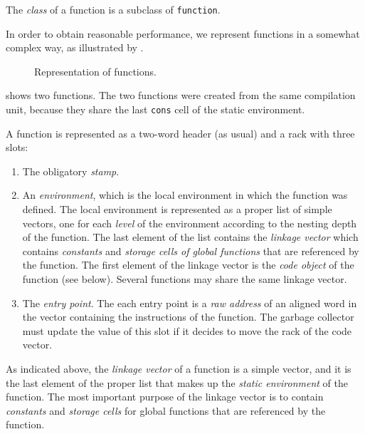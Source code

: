 The \emph{class} of a function is a subclass of \texttt{function}.

In order to obtain reasonable performance, we represent functions in a
somewhat complex way, as illustrated by
.

\begin{figure}
\begin{center}
\end{center}
\caption{\label{fig-function-representation}
Representation of functions.}
\end{figure}

 shows two functions.  The two
functions were created from the same compilation unit, because they
share the last \texttt{cons} cell of the static environment.

A function is represented as a two-word header (as usual) and a
rack with three slots:

\begin{enumerate}
\item The obligatory \emph{stamp}.
\item An \emph{environment}, which is the local environment in which
  the function was defined.  The local environment is represented as a
  proper list of simple vectors, one for each \emph{level} of the
  environment according to the nesting depth of the function.  The
  last element of the list contains the \emph{linkage vector} which
  contains \emph{constants} and \emph{storage cells of global
    functions} that are referenced by the function.  The first element
  of the linkage vector is the \emph{code object} of the function (see
  below).  Several functions may share the same linkage vector.
\item The \emph{entry point}.  The each entry
  point is a \emph{raw address} of an aligned word in the vector
  containing the instructions of the function.  The garbage collector
  must update the value of this slot if it decides to move the
  rack of the code vector.
\end{enumerate}

As indicated above, the \emph{linkage vector} of a function is a
simple vector, and it is the last element of the proper list that
makes up the \emph{static environment} of the function.  The most
important purpose of the linkage vector is to contain \emph{constants}
and \emph{storage cells} for global functions that are referenced by
the function.

